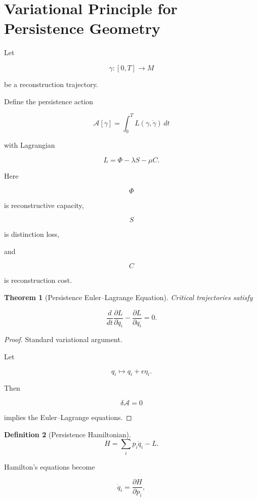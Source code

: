 \documentclass[12pt,oneside]{article}
\newtheorem{theorem}{Theorem}[section] \newtheorem{lemma}[theorem]{Lemma} \newtheorem{proposition}[theorem]{Proposition} \newtheorem{corollary}[theorem]{Corollary}
\theoremstyle{definition}
\newtheorem{definition}[theorem]{Definition} \newtheorem{axiom}[theorem]{Axiom} \newtheorem{remark}[theorem]{Remark} \newtheorem{example}[theorem]{Example}
\begin{document}
\section{Variational Principle for Persistence Geometry}

Let

\[
\gamma:[0,T]\to M
\]

be a reconstruction trajectory.

Define the persistence action

\[
\mathcal A[\gamma]
=
\int_0^T
L(\gamma,\dot\gamma)
\,dt
\]

with Lagrangian

\[
L
=
\Phi
-
\lambda S
-
\mu C.
\]

Here

\[
\Phi
\]

is reconstructive capacity,

\[
S
\]

is distinction loss,

and

\[
C
\]

is reconstruction cost.

\begin{theorem}[Persistence Euler--Lagrange Equation]

Critical trajectories satisfy

\[
\frac{d}{dt}
\frac{\partial L}
{\partial \dot q_i}
-
\frac{\partial L}
{\partial q_i}
=
0.
\]

\end{theorem}

\begin{proof}

Standard variational argument.

Let

\[
q_i
\mapsto
q_i+\epsilon\eta_i.
\]

Then

\[
\delta\mathcal A
=
0
\]

implies the Euler--Lagrange equations.

\end{proof}

\begin{definition}[Persistence Hamiltonian]

\[
H
=
\sum_i
p_i\dot q_i
-
L.
\]

\end{definition}

Hamilton's equations become

\[
\dot q_i
=
\frac{\partial H}{\partial p_i},
\]
\end{document}
